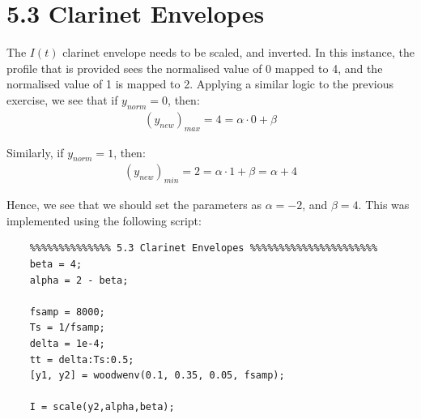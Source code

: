 \documentclass{article}
\begin{document}
\section{5.3 Clarinet Envelopes}
The $I(t)$ clarinet envelope needs to be scaled, and inverted. In this instance, the profile that is provided sees the normalised value of 0 mapped to 4, and the normalised value of 1 is mapped to 2. Applying a similar logic to the previous exercise, we see that if $y_{norm} = 0$, then:
\begin{align*}
	(y_{new})_{max} = 4 = \alpha \cdot 0 + \beta
\end{align*}

Similarly, if $y_{norm} = 1$, then:
\begin{align*}
	(y_{new})_{min} = 2 = \alpha \cdot 1 + \beta = \alpha + 4
\end{align*}

Hence, we see that we should set the parameters as $\alpha = -2$, and $\beta = 4$. This was implemented using the following script:
\begin{lstlisting}
	%%%%%%%%%%%%%% 5.3 Clarinet Envelopes %%%%%%%%%%%%%%%%%%%%%%
	beta = 4;
	alpha = 2 - beta;
	
	fsamp = 8000;
	Ts = 1/fsamp;
	delta = 1e-4;
	tt = delta:Ts:0.5;
	[y1, y2] = woodwenv(0.1, 0.35, 0.05, fsamp);
	
	I = scale(y2,alpha,beta);
\end{lstlisting}
\end{document}
